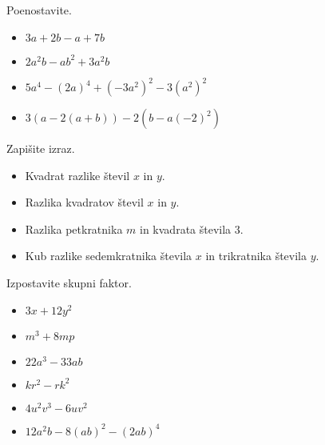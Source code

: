         
    
        
            \begin{naloga}
                Poenostavite.
                \begin{itemize}
                    \item $3a+2b-a+7b$ 
                    \item $2a^2b-ab^2+3a^2b$ 
                    \item $5a^4-(2a)^4+(-3a^2)^2-3(a^2)^2$ 
                    \item $3(a-2(a+b))-2(b-a(-2)^2)$ 
                \end{itemize}
            \end{naloga}
        
    
        
            \begin{naloga}
                Zapišite izraz.
                \begin{itemize}
                    \item Kvadrat razlike števil $x$ in $y$. 
                    \item Razlika kvadratov števil $x$ in $y$. 
                    \item Razlika petkratnika $m$ in kvadrata števila $3$. 
                    \item Kub razlike sedemkratnika števila $x$ in trikratnika števila $y$. 
                \end{itemize}
            \end{naloga}
        
    
        
            \begin{naloga}
                Izpostavite skupni faktor.
                \begin{itemize}
                    \item $3x+12y^2$ 
                    \item $m^3+8mp$ 
                    \item $22a^3-33ab$ 
                    \item $kr^2-rk^2$ 
                    \item $4u^2v^3-6uv^2$ 
                    \item $12a^2b-8(ab)^2-(2ab)^4$ 
                \end{itemize}
            \end{naloga}
        
    
        
